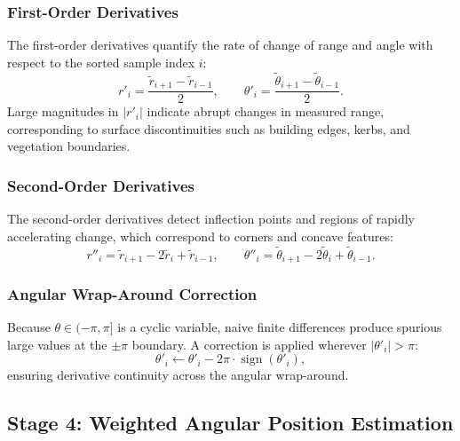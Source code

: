 \documentclass[lettersize,journal]{IEEEtran}
\begin{document}
\subsubsection{First-Order Derivatives}

The first-order derivatives quantify the rate of change of range and angle
with respect to the sorted sample index $i$:
\begin{equation}
  r'_i = \frac{\tilde{r}_{i+1} - \tilde{r}_{i-1}}{2}, \qquad
  \theta'_i = \frac{\tilde{\theta}_{i+1} - \tilde{\theta}_{i-1}}{2}.
  \label{eq:first_deriv}
\end{equation}
Large magnitudes in $|r'_i|$ indicate abrupt changes in measured range,
corresponding to surface discontinuities such as building edges, kerbs, and
vegetation boundaries.

\subsubsection{Second-Order Derivatives}

The second-order derivatives detect inflection points and regions of rapidly
accelerating change, which correspond to corners and concave features:
\begin{equation}
  r''_i = \tilde{r}_{i+1} - 2\tilde{r}_i + \tilde{r}_{i-1}, \qquad
  \theta''_i = \tilde{\theta}_{i+1} - 2\tilde{\theta}_{i} + \tilde{\theta}_{i-1}.
  \label{eq:second_deriv}
\end{equation}

\subsubsection{Angular Wrap-Around Correction}

Because $\theta \in (-\pi, \pi]$ is a cyclic variable, naive finite differences
produce spurious large values at the $\pm\pi$ boundary. A correction is applied
wherever $|\theta'_i| > \pi$:
\begin{equation}
  \theta'_i \leftarrow \theta'_i - 2\pi \cdot \operatorname{sign}(\theta'_i),
  \label{eq:wraparound}
\end{equation}
ensuring derivative continuity across the angular wrap-around.

\subsection{Stage 4: Weighted Angular Position Estimation}
\end{document}
